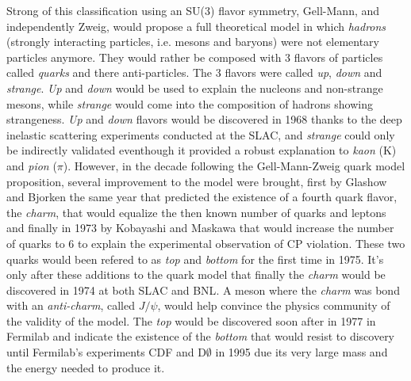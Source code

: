 	Strong of this classification using an SU(3) flavor symmetry, Gell-Mann, and independently Zweig, would propose a full theoretical model in which \textit{hadrons} (strongly interacting particles, i.e. mesons and baryons) were not elementary particles anymore. They would rather be composed with 3 flavors of particles called \textit{quarks} and there anti-particles. The 3 flavors were called \textit{up}, \textit{down} and \textit{strange}. \textit{Up} and \textit{down} would be used to explain the nucleons and non-strange mesons, while \textit{strange} would come into the composition of hadrons showing strangeness. \textit{Up} and \textit{down} flavors would be discovered in 1968 thanks to the deep inelastic scattering experiments conducted at the \acf{SLAC}, and \textit{strange} could only be indirectly validated eventhough it provided a robust explanation to \textit{kaon} (K) and \textit{pion} ($\pi$). However, in the decade following the Gell-Mann-Zweig quark model proposition, several improvement to the model were brought, first by Glashow and Bjorken the same year that predicted the existence of a fourth quark flavor, the \textit{charm}, that would equalize the then known number of quarks and leptons and finally in 1973 by Kobayashi and Maskawa that would increase the number of quarks to 6 to explain the experimental observation of CP violation. These two quarks would been refered to as \textit{top} and \textit{bottom} for the first time in 1975. It's only after these additions to the quark model that finally the \textit{charm} would be discovered in 1974 at both SLAC and \acf{BNL}. A meson where the \textit{charm} was bond with an \textit{anti-charm}, called $J/\psi$, would help convince the physics community of the validity of the model. The \textit{top} would be discovered soon after in 1977 in Fermilab and indicate the existence of the \textit{bottom} that would resist to discovery until Fermilab's experiments CDF and D$\emptyset$ in 1995 due its very large mass and the energy needed to produce it.
	
